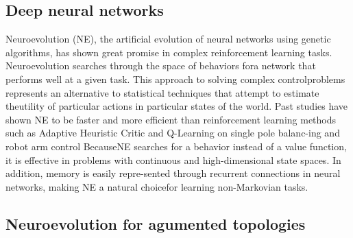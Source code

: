 \subsection{Deep neural networks}
Neuroevolution (NE), the artificial evolution of neural networks using genetic algorithms, 
has shown great promise in complex reinforcement learning tasks. 
Neuroevolution searches through the space of behaviors fora network that performs well
at a given task.
This approach to solving complex controlproblems represents an alternative to statistical
techniques that attempt to estimate theutility of particular actions in particular states
of the world.
Past studies have shown NE to be faster and more efficient than reinforcement learning methods
such as Adaptive Heuristic Critic and Q-Learning on single pole balanc-ing and robot arm control
BecauseNE searches for a behavior instead of a value function, it is effective in problems with
continuous and high-dimensional state spaces.
In addition,  memory is easily repre-sented through recurrent connections in neural networks,
making NE a natural choicefor learning non-Markovian tasks.

\subsection{Neuroevolution for agumented topologies}

